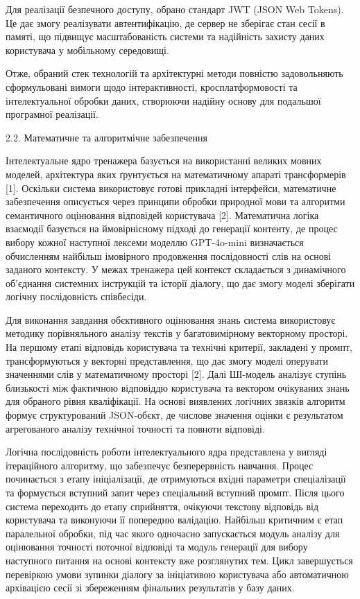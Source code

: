 \documentclass[
]{article}
\begin{document}
Для реалізації безпечного доступу, обрано стандарт JWT (JSON Web
Tokens). Це дає змогу реалізувати автентифікацію, де сервер не зберігає
стан сесії в пам\textquotesingle яті, що підвищує масштабованість
системи та надійність захисту даних користувача у мобільному середовищі.

Отже, обраний стек технологій та архітектурні методи повністю
задовольняють сформульовані вимоги щодо інтерактивності,
кросплатформовості та інтелектуальної обробки даних, створюючи надійну
основу для подальшої програмної реалізації.

\protect{}\label{_Toc228981060}{}2.2. Математичне та
алгоритмічне забезпечення

Інтелектуальне ядро тренажера базується на використанні великих мовних
моделей, архітектура яких ґрунтується на математичному апараті
трансформерів {[}1{]}. Оскільки система використовує готові прикладні
інтерфейси, математичне забезпечення описується через принципи обробки
природної мови та алгоритми семантичного оцінювання відповідей
користувача {[}2{]}. Математична логіка взаємодії базується на
ймовірнісному підході до генерації контенту, де процес вибору кожної
наступної лексеми моделлю GPT-4o-mini визначається обчисленням найбільш
імовірного продовження послідовності слів на основі заданого контексту.
У межах тренажера цей контекст складається з динамічного об'єднання
системних інструкцій та історії діалогу, що дає змогу моделі зберігати
логічну послідовність співбесіди.

Для виконання завдання об\textquotesingle єктивного оцінювання знань
система використовує методику порівняльного аналізу текстів у
багатовимірному векторному просторі. На першому етапі відповідь
користувача та технічні критерії, закладені у промпт, трансформуються у
векторні представлення, що дає змогу моделі оперувати значеннями слів у
математичному просторі {[}2{]}. Далі ШІ-модель аналізує ступінь
близькості між фактичною відповіддю користувача та вектором очікуваних
знань для обраного рівня кваліфікації. На основі виявлених логічних
зв\textquotesingle язків алгоритм формує структурований
JSON-об\textquotesingle єкт, де числове значення оцінки є результатом
агрегованого аналізу технічної точності та повноти відповіді.

Логічна послідовність роботи інтелектуального ядра представлена у
вигляді ітераційного алгоритму, що забезпечує безперервність навчання.
Процес починається з етапу ініціалізації, де отримуються вхідні
параметри спеціалізації та формується вступний запит через спеціальний
вступний промпт. Після цього система переходить до етапу сприйняття,
очікуючи текстову відповідь від користувача та виконуючи її попередню
валідацію. Найбільш критичним є етап паралельної обробки, під час якого
одночасно запускається модуль аналізу для оцінювання точності поточної
відповіді та модуль генерації для вибору наступного питання на основі
контексту вже розглянутих тем. Цикл завершується перевіркою умови
зупинки діалогу за ініціативою користувача або автоматичною архівацією
сесії зі збереженням фінальних результатів у базу даних.
\end{document}
